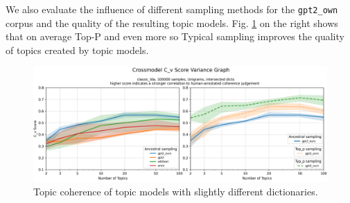 We also evaluate the influence of different sampling methods for the \texttt{gpt2\_own} corpus and the quality of the resulting topic models. Fig. \ref{fig:Unigrams-100000-crossmodel-cv-var-classic_lda-gpt2+nt-is} on the right shows that on average Top-P and even more so Typical sampling improves the quality of topics created by topic models.
\begin{figure}[H]
    \centering
    \includegraphics[width=1\textwidth]{figures/Unigrams-100000-crossmodel-cv-var-classic_lda-gpt2+nt-is}
    \caption{Topic coherence of topic models with slightly different dictionaries.}
    \label{fig:Unigrams-100000-crossmodel-cv-var-classic_lda-gpt2+nt-is}
\end{figure}

